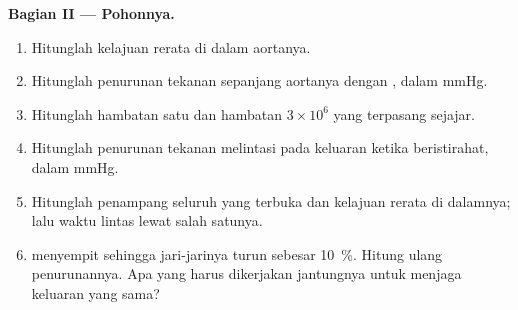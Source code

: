 \begin{problem}
\medskip
\noindent\textbf{Bagian II --- Pohonnya.}
\begin{enumerate}[resume]
  \item Hitunglah kelajuan rerata di dalam aortanya.
  \item Hitunglah penurunan tekanan sepanjang aortanya dengan , dalam mmHg.
  \item Hitunglah hambatan satu  dan hambatan $3\times
        10^{6}$ yang terpasang sejajar.
  \item Hitunglah penurunan tekanan melintasi  pada
        keluaran ketika beristirahat, dalam mmHg.
  \item Hitunglah penampang seluruh  yang terbuka dan kelajuan
        rerata di dalamnya; lalu waktu lintas lewat salah satunya.
  \item {} menyempit sehingga jari-jarinya turun sebesar
        \qty{10}{\%}. Hitung ulang penurunannya. Apa yang harus
        dikerjakan jantungnya untuk menjaga keluaran yang sama?
\end{enumerate}


\end{problem}
